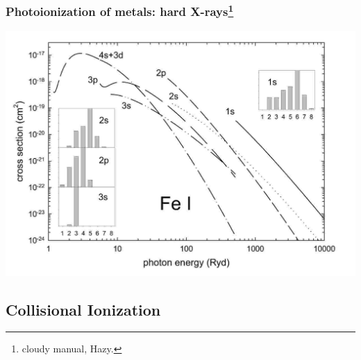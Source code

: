 \begin{frame}\frametitle{Photoionization of metals: hard X-rays\footnote{{\sc cloudy} manual, Hazy.}}

  \begin{center}
    \includegraphics[width=\textwidth,height=!]{./C/auger_FeI.jpg}
  \end{center}



\end{frame}

\subsection{Collisional Ionization}

